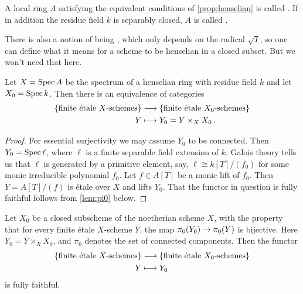 \begin{defi}\label{def:henselian}
	A local ring $A$ satisfying the equivalent conditions of \cref{prop:henselian} is called . If in addition the residue field $k$ is separably closed, $A$ is called .
\end{defi}
There is also a notion of being , which only depends on the radical $\sqrt{I}$, so one can define what it means for a scheme to be henselian in a closed subset. But we won't need that here.

\begin{prop}\label{prop:pi1Henselian}
	Let $X=\operatorname{Spec} A$ be the spectrum of a henselian ring with residue field $k$ and let $X_0=\operatorname{Spec} k$. Then there is an equivalence of categories
	\begin{align*}
		\left\{\text{finite étale $X$-schemes}\right\}&\morphism \left\{\text{finite étale $X_0$-schemes}\right\}\\
		Y&\longmapsto Y_0=Y\times_XX_0\,.
	\end{align*}
\end{prop}
\begin{proof}
	For essential surjectivity we may assume $Y_0$ to be connected. Then $Y_0=\operatorname{Spec} \ell$, where $\ell$ is a finite separable field extension of $k$. Galois theory tells us that $\ell$ is generated by a primitive element, say, $\ell\cong k[T]/(f_0)$ for some monic irreducible polynomial $f_0$. Let $f\in A[T]$ be a monic lift of $f_0$. Then $Y=A[T]/(f)$ is étale over $X$ and lifts $Y_0$. 
	That the functor in question is fully faithful follows from \cref{lem:pi0} below.
\end{proof}
\begin{lem}\label{lem:pi0}
	Let $X_0$ be a closed subscheme of the noetherian scheme $X$, with the property that for every finite étale $X$-scheme $Y$, the map $\pi_0(Y_0)\morphism \pi_0(Y)$ is bijective. Here $Y_0=Y\times_XX_0$, and $\pi_0$ denotes the set of connected components. Then the functor
	\begin{align*}
		\left\{\text{finite étale $X$-schemes}\right\}&\morphism \left\{\text{finite étale $X_0$-schemes}\right\}\\
		Y&\longmapsto Y_0
	\end{align*}
	is fully faithful.
\end{lem}
